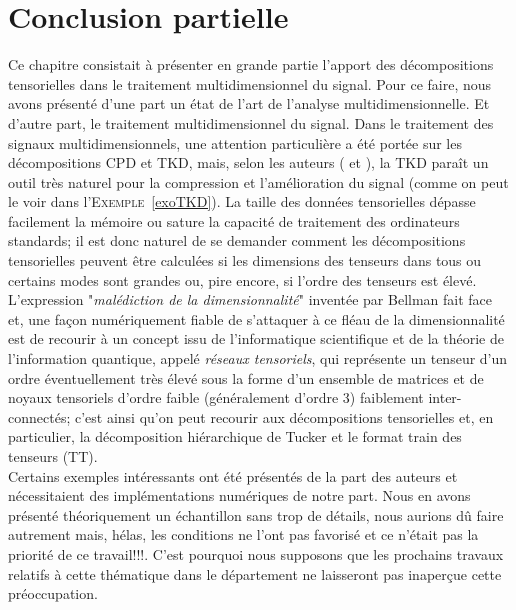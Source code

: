 \documentclass[11pt,a4paper,oneside]{book}
\newcommand{\exoref}[1]{\textsc{Exemple}~\ref{#1}}
\begin{document}
\section*{Conclusion partielle}
Ce chapitre consistait à présenter en grande partie l'apport des décompositions tensorielles dans le traitement multidimensionnel du signal. Pour ce faire, nous avons  présenté d'une part un état de l'art de l'analyse multidimensionnelle. Et d'autre part, le traitement multidimensionnel du signal. Dans le traitement des signaux multidimensionnels, une attention particulière a été portée sur les décompositions CPD et TKD, mais, selon les auteurs (\cite{MUTIfrance} et \cite{cichocki2015tensor}), la TKD paraît un outil très naturel pour la compression et l'amélioration du signal (comme on peut le voir dans l'\exoref{exoTKD}). La  taille des données tensorielles dépasse facilement la mémoire ou sature la capacité de traitement des ordinateurs standards; il est donc naturel de se demander comment les décompositions tensorielles peuvent être calculées si les dimensions des tenseurs dans tous ou certains modes sont grandes ou, pire encore, si l'ordre des tenseurs est élevé. L'expression "\textit{malédiction de la dimensionnalité}" inventée par Bellman fait face et, une façon numériquement fiable de s'attaquer à ce fléau de la dimensionnalité est de recourir à un concept issu de l'informatique scientifique et de la théorie de l'information quantique, appelé \textit{réseaux tensoriels}, qui représente un tenseur d'un ordre éventuellement très élevé sous la forme d'un ensemble de matrices et de noyaux tensoriels d'ordre faible (généralement d'ordre 3) faiblement inter-connectés; c'est ainsi qu'on peut recourir aux décompositions tensorielles et, en particulier, la décomposition hiérarchique de Tucker et  le format train  des tenseurs (TT).\\
 Certains exemples intéressants ont été présentés de la part des auteurs et nécessitaient des implémentations numériques de notre part. Nous en avons présenté théoriquement un échantillon sans trop de détails, nous aurions dû faire autrement mais, hélas, les conditions ne l'ont pas favorisé et ce n'était pas la priorité de ce travail!!!. C'est pourquoi nous supposons que les prochains travaux relatifs à cette thématique dans le département ne laisseront pas inaperçue cette préoccupation.
 
\end{document}
